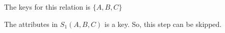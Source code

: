 \documentclass[12pt]{article}
\begin{document}
\begin{enumerate}[1.]
\begin{enumerate}[a)]
\begin{enumerate}[i)]
\begin{enumerate}[1.]
                \bigskip

                \color{red}
                The keys for this relation is $\{A,B,C\}$

                \bigskip

                The attributes in $S_1(A,B,C)$ is a key. So, this step can be skipped.
                \color{black}

                \bigskip

            \end{enumerate}
        \end{enumerate}



    \end{enumerate}

\end{enumerate}
\end{document}
